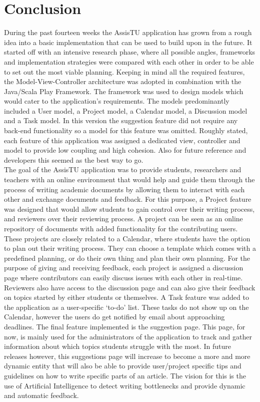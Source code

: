 \chapter{Conclusion}

During the past fourteen weeks the AssisTU application has grown from a rough idea into a basic implementation that can be used to build upon in the 
future. It started off with an intensive research phase, where all possible angles, frameworks and implementation strategies were compared with each
other in order to be able to set out the most viable planning. Keeping in mind all the required features, the Model-View-Controller architecture was 
adopted in combination with the Java/Scala Play Framework.
The framework was used to design models which would cater to the application's requirements. The models predominantly included a User model, a Project 
model, a Calendar model, a Discussion model and a Task model. In this version the suggestion feature did not require any back-end functionality so a 
model for this feature was omitted. Roughly stated, each feature of this application was assigned a dedicated view, controller and model to provide low
coupling and high cohesion. Also for future reference and developers this seemed as the best way to go. \\

The goal of the AssisTU application was to provide students, researchers and teachers with an online environment that would help and guide them through
the process of writing academic documents by allowing them to interact with each other and exchange documents and feedback. For this purpose, a Project
feature was designed that would allow students to gain control over their writing process, and reviewers over their reviewing process. A project can be
seen as an online repository of documents with added functionality for the contributing users. These projects are closely related to a Calendar,
where students have the option to plan out their writing process. They can choose a template which comes with a predefined planning, or do their
own thing and plan their own planning. For the purpose of giving and receiving feedback, each project is assigned a discussion page where contributors
can easily discuss issues with each other in real-time. Reviewers also have access to the discussion page and can also give their feedback on topics
started by either students or themselves. A Task feature was added to the application as a user-specific `to-do' list. These tasks do not show up
on the Calendar, however the users do get notified by email about approaching deadlines. The final feature implemented is the suggestion page. This page,
for now, is mainly used for the administrators of the application to track and gather information about which topics students struggle with the most. In 
future releases however, this suggestions page will increase to become a more and more dynamic entity that will also be able to provide user/project 
specific tips and guidelines on how to write specific parts of an article. The vision for this is the use of Artificial Intelligence to detect writing 
bottlenecks and provide dynamic and automatic feedback.